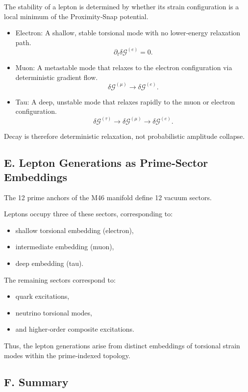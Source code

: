 \documentclass[reprint,amsmath,amssymb,aps,prl,floatfix]{revtex4-2}
\begin{document}
The stability of a lepton is determined by whether its strain configuration is a local minimum of the Proximity‑Snap potential.
\begin{itemize}
\item Electron:  
  A shallow, stable torsional mode with no lower‑energy relaxation path.  
  \[
  \partial_t \delta\mathcal{G}^{(e)} = 0.
  \]

\item Muon:  
  A metastable mode that relaxes to the electron configuration via deterministic gradient flow.  
  \[
  \delta\mathcal{G}^{(\mu)} \rightarrow \delta\mathcal{G}^{(e)}.
  \]

\item Tau:  
  A deep, unstable mode that relaxes rapidly to the muon or electron configuration.  
  \[
  \delta\mathcal{G}^{(\tau)} \rightarrow \delta\mathcal{G}^{(\mu)} \rightarrow \delta\mathcal{G}^{(e)}.
  \]
\end{itemize}
\medskip

Decay is therefore deterministic relaxation, not probabilistic amplitude collapse.

\subsection{E. Lepton Generations as Prime‑Sector Embeddings}

The 12 prime anchors of the M46 manifold define 12 vacuum sectors.  
\medskip

Leptons occupy three of these sectors, corresponding to:
\begin{itemize}
\item shallow torsional embedding (electron),  
\item intermediate embedding (muon),  
\item deep embedding (tau).
\end{itemize}
\medskip

The remaining sectors correspond to:
\begin{itemize}
\item quark excitations,  
\item neutrino torsional modes,  
\item and higher‑order composite excitations.
\end{itemize}

Thus, the lepton generations arise from distinct embeddings of torsional strain modes within the prime‑indexed topology.

\subsection{F. Summary}
\end{document}
